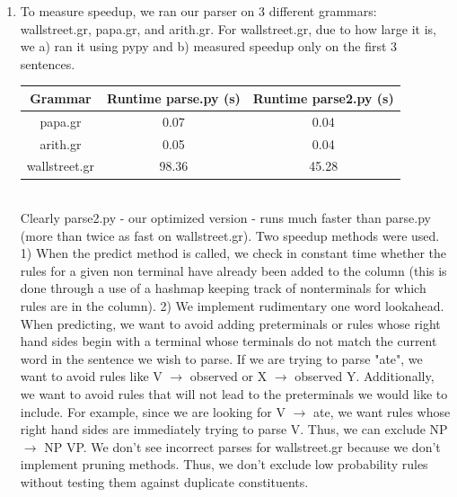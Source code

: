 \documentclass[12pt,a4paper]{article}
\begin{document}
\begin{enumerate}
\begin{enumerate}[label=(\alph*)]
\end{enumerate}
\item
To measure speedup, we ran our parser on 3 different grammars: wallstreet.gr, papa.gr, and arith.gr. For wallstreet.gr, due to how large it is, we a) ran it using pypy and b) measured speedup only on the first 3 sentences.\\
\begin{tabular}{|c|c|c|}
\hline 
Grammar & Runtime parse.py (s) & Runtime parse2.py (s) \\ 
\hline 
papa.gr & 0.07 & 0.04 \\ 
\hline 
arith.gr & 0.05 & 0.04 \\ 
\hline 
wallstreet.gr & 98.36 & 45.28 \\ 
\hline
\end{tabular} 
\\
Clearly parse2.py - our optimized version - runs much faster than parse.py (more than twice as fast on wallstreet.gr). Two speedup methods were used. 1) When the predict method is called, we check in constant time whether the rules for a given non terminal have already been added to the column (this is done through a use of a hashmap keeping track of nonterminals for which rules are in the column). 2) We implement rudimentary one word lookahead. When predicting, we want to avoid adding preterminals or rules whose right hand sides begin with a terminal whose terminals do not match the current word in the sentence we wish to parse. If we are trying to parse "ate", we want to avoid rules like V $\rightarrow$ observed or X $\rightarrow$ observed Y. Additionally, we want to avoid rules that will not lead to the preterminals we would like to include. For example, since we are looking for V $\rightarrow$ ate, we want rules whose right hand sides are immediately trying to parse V. Thus, we can exclude NP $\rightarrow$ NP VP. We don't see incorrect parses for wallstreet.gr because we don't implement pruning methods. Thus, we don't exclude low probability rules without testing them against duplicate constituents. 
\end{enumerate}
\end{document}
